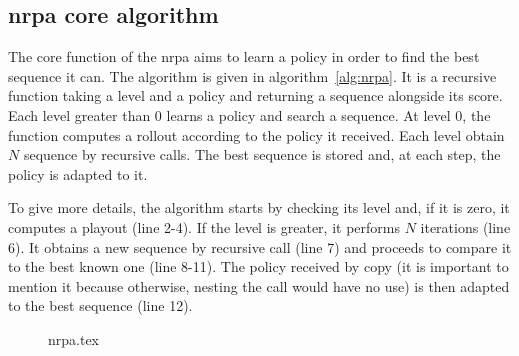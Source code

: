 \subsection{\acrshort{nrpa} core algorithm}%
\label{sub:nrpa_core}

The core function of the \gls{nrpa} aims to learn a policy in order to find the best sequence it can.
The algorithm is given in algorithm~\ref{alg:nrpa}.
It is a recursive function taking a level and a policy and returning a sequence alongside its score.
Each level greater than 0 learns a policy and search a sequence.
At level 0, the function computes a rollout according to the policy it received.
Each level obtain \(N\) sequence by recursive calls.
The best sequence is stored and, at each step, the policy is adapted to it.

To give more details, the algorithm starts by checking its level and, if it is zero, it computes a playout (line 2-4).
If the level is greater, it performs \(N\) iterations (line 6).
It obtains a new sequence by recursive call (line 7) and proceeds to compare it to the best known one (line 8-11).
The policy received by copy (it is important to mention it because otherwise, nesting the call would have no use) is then adapted to the best sequence (line 12).

\begin{figure}[htpb]
    \centering
    \begin{minipage}{.7\linewidth}
        {nrpa.tex}
    \end{minipage}
\end{figure}


